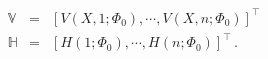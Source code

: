 \documentclass[12pt]{article}
\begin{document}
\begin{eqnarray*}
	\mathbb{V} &= & \left[V(X, 1; \Phi_0), \cdots, V(X, n; \Phi_0)  \right]^{\intercal} \\
	\mathbb{H}  & = &  \left[{H}(1; \Phi_0), \cdots, {H}(n; \Phi_0)\right]^{\intercal}  \,.
\end{eqnarray*}
\end{document}
